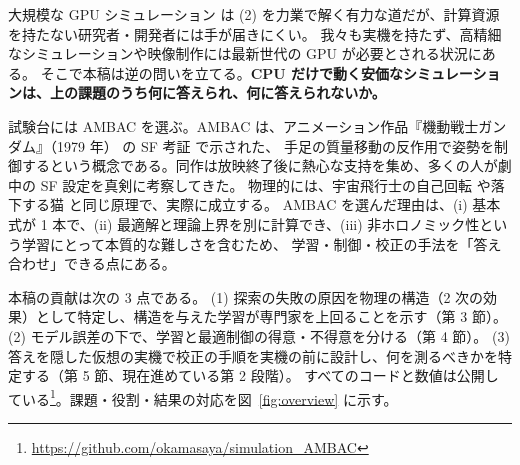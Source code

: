 \documentclass[paper=a4paper,fontsize=10pt,twocolumn,column_gap=2zw,line_length=24zw,number_of_lines=46,head_space=20mm]{jlreq}
\newcommand{\repo}{https://github.com/okamasaya/simulation_AMBAC}
\begin{document}
大規模な GPU シミュレーション \cite{makoviychuk2021} は (2) を力業で解く有力な道だが、計算資源を持たない研究者・開発者には手が届きにくい。
我々も実機を持たず、高精細なシミュレーションや映像制作には最新世代の GPU が必要とされる状況にある。
そこで本稿は逆の問いを立てる。\textbf{CPU だけで動く安価なシミュレーションは、上の課題のうち何に答えられ、何に答えられないか。}

試験台には AMBAC を選ぶ。AMBAC は、アニメーション作品『機動戦士ガンダム』（1979 年）\cite{gundam} の SF 考証 \cite{gcentury} で示された、
手足の質量移動の反作用で姿勢を制御するという概念である。同作は放映終了後に熱心な支持を集め、多くの人が劇中の SF 設定を真剣に考察してきた。
物理的には、宇宙飛行士の自己回転 \cite{kane1970} や落下する猫 \cite{kane1969,montgomery1993} と同じ原理で、実際に成立する。
AMBAC を選んだ理由は、(i) 基本式が 1 本で、(ii) 最適解と理論上界を別に計算でき、(iii) 非ホロノミック性という学習にとって本質的な難しさを含むため、
学習・制御・校正の手法を「答え合わせ」できる点にある。

本稿の貢献は次の 3 点である。
(1) 探索の失敗の原因を物理の構造（2 次の効果）として特定し、構造を与えた学習が専門家を上回ることを示す（第 3 節）。
(2) モデル誤差の下で、学習と最適制御の得意・不得意を分ける（第 4 節）。
(3) 答えを隠した仮想の実機で校正の手順を実機の前に設計し、何を測るべきかを特定する（第 5 節、現在進めている第 2 段階）。
すべてのコードと数値は公開している\footnote{\url{\repo}}。課題・役割・結果の対応を図~\ref{fig:overview} に示す。
\end{document}
